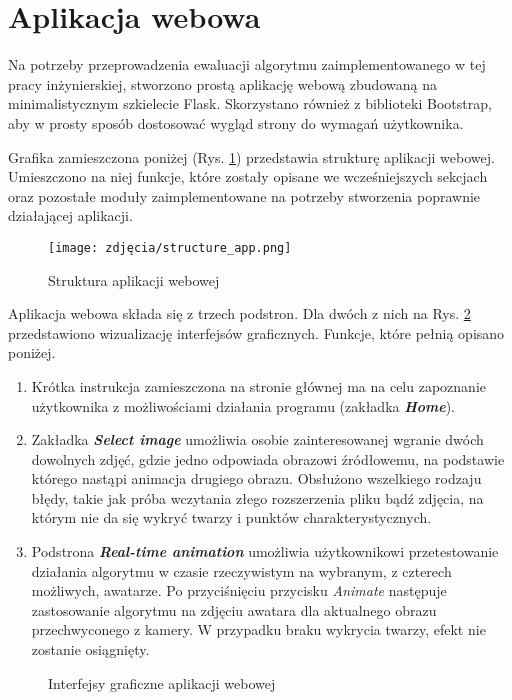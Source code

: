 \newpage

\section{Aplikacja webowa}
Na potrzeby przeprowadzenia ewaluacji algorytmu zaimplementowanego w tej pracy inżynierskiej, stworzono prostą aplikację webową zbudowaną na minimalistycznym szkielecie Flask. Skorzystano również z biblioteki Bootstrap, aby w prosty sposób dostosować wygląd strony do wymagań użytkownika.

Grafika zamieszczona poniżej (Rys. \ref{fig:structureApp}) przedstawia strukturę aplikacji webowej. Umieszczono na niej funkcje, które zostały opisane we wcześniejszych sekcjach oraz pozostałe moduły zaimplementowane na potrzeby stworzenia poprawnie działającej aplikacji.

\begin{figure}[h]
	\centering
	\texttt{[image: zdjęcia/structure\_app.png]}
	\caption{Struktura aplikacji webowej} 
	\label{fig:structureApp}
\end{figure}

Aplikacja webowa składa się z trzech podstron. Dla dwóch z nich na Rys. \ref{fig:app} przedstawiono wizualizację interfejsów graficznych. Funkcje, które pełnią opisano poniżej.

\begin{enumerate}
    \item Krótka instrukcja zamieszczona na stronie głównej ma na celu zapoznanie użytkownika z możliwościami działania programu (zakładka \textbf{\textit{Home}}).
    \item Zakładka \textbf{\textit{Select image}} umożliwia osobie zainteresowanej wgranie dwóch dowolnych zdjęć, gdzie jedno odpowiada obrazowi źródłowemu, na podstawie którego nastąpi animacja drugiego obrazu. Obsłużono wszelkiego rodzaju błędy, takie jak próba wczytania złego rozszerzenia pliku bądź zdjęcia, na którym nie da się wykryć twarzy i punktów charakterystycznych.
    \item Podstrona \textbf{\textit{Real-time animation}} umożliwia użytkownikowi przetestowanie działania algorytmu w czasie rzeczywistym na wybranym, z czterech możliwych, awatarze. Po przyciśnięciu przycisku \textit{Animate} następuje zastosowanie algorytmu na zdjęciu awatara dla aktualnego obrazu przechwyconego z kamery. W przypadku braku wykrycia twarzy, efekt nie zostanie osiągnięty.
\end{enumerate}

\begin{figure}[h]
	\centering
	\quad
	\caption{\label{fig:app}Interfejsy graficzne aplikacji webowej}
\end{figure}


